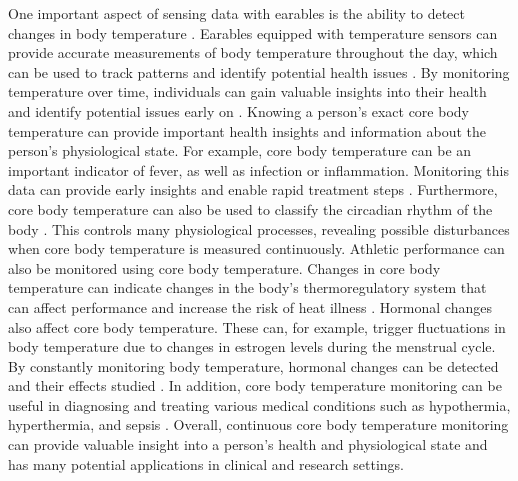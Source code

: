 One important aspect of sensing data with earables is the ability to detect changes in body temperature \cite{dolsonWearableSensorTechnology2022, bonziAccuracyPeripheralThermometers2016, NovelWearableDevice2021}. 
Earables equipped with temperature sensors can provide accurate measurements of body temperature throughout the day, which can be used to track patterns and identify potential health issues \cite{rajbhandaryFeasibilityContinuousMonitoring2020a}.
By monitoring temperature over time, individuals can gain valuable insights into their health and identify potential issues early on \cite{mrozekBrainTemperaturePhysiology2012}.
Knowing a person's exact core body temperature can provide important health insights and information about the person's physiological state.
For example, core body temperature can be an important indicator of fever, as well as infection or inflammation. 
Monitoring this data can provide early insights and enable rapid treatment steps \cite{NovelWearableDevice2021}.
Furthermore, core body temperature can also be used to classify the circadian rhythm of the body \cite{liCircadianRhythmAnalysis2021, juSleepQualityPreclinical2013}.
This controls many physiological processes, revealing possible disturbances when core body temperature is measured continuously.
Athletic performance can also be monitored using core body temperature. Changes in core body temperature can indicate changes in the body's thermoregulatory system that can affect performance and increase the risk of heat illness \cite{gabbettAthleteMonitoringCycle2017, silvaSleepQualityTraining2022}.
Hormonal changes also affect core body temperature. 
These can, for example, trigger fluctuations in body temperature due to changes in estrogen levels during the menstrual cycle. 
By constantly monitoring body temperature, hormonal changes can be detected and their effects studied \cite{goeckenjanContinuousBodyTemperature2020, charkoudianAutonomicControlBody2017, hamataniEstimatingCoreBody2015}.
In addition, core body temperature monitoring can be useful in diagnosing and treating various medical conditions such as hypothermia, hyperthermia, and sepsis \cite{hardingTemperatureDependenceSleep2019, guilleminaultChronicInsomniaPremenopausal2002, raymannSkinDeepEnhanced2008}.
Overall, continuous core body temperature monitoring can provide valuable insight into a person's health and physiological state and has many potential applications in clinical and research settings.

